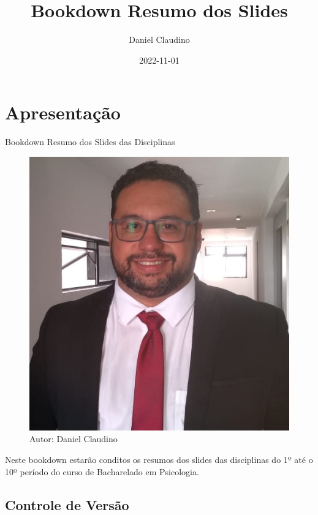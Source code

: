 \documentclass[
]{book}
\title{Bookdown Resumo dos Slides}
\author{Daniel Claudino}
\date{2022-11-01}
\begin{document}
\maketitle

{
\setcounter{tocdepth}{1}
\tableofcontents
}
\hypertarget{apresentauxe7uxe3o}{%
\chapter{Apresentação}\label{apresentauxe7uxe3o}}

Bookdown Resumo dos Slides das Disciplinas

\begin{figure}

{\centering \includegraphics[width=0.5\linewidth]{imagens/FOTO-PERFIL-DANIEL-CLAUDINO-2020} 

}

\caption{Autor: Daniel Claudino}\label{fig:unnamed-chunk-1}
\end{figure}

Neste bookdown estarão conditos os resumos dos slides das disciplinas do 1º até o 10º período do curso de Bacharelado em Psicologia.

\hypertarget{controle-de-versuxe3o}{%
\section{Controle de Versão}\label{controle-de-versuxe3o}}
\end{document}
